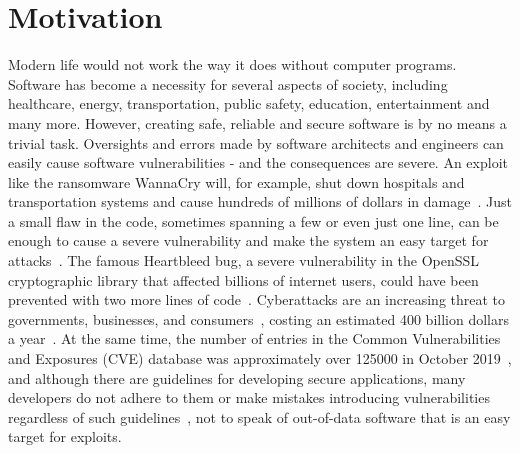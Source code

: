 \documentclass[
a4paper,
pagesize,
pdftex,
12pt,
twoside, %
BCOR=5mm, %
ngerman,
fleqn,
final,
]{scrartcl}
\begin{document}
	
	\setcounter{secnumdepth}{5} %
	
	\newpage
	\section{Motivation}\label{Motivation}
	Modern life would not work the way it does without computer programs. Software has become a necessity for several aspects of society, including healthcare, energy, transportation, public safety, education, entertainment and many more. However, creating safe, reliable and secure software is by no means a trivial task. Oversights and errors made by software architects and engineers can easily cause software vulnerabilities - and the consequences are severe. An exploit like the ransomware WannaCry will, for example, shut down hospitals and transportation systems and cause hundreds of millions of dollars in damage~\cite{DanGoodin.2017}. Just a small flaw in the code, sometimes spanning a few or even just one line, can be enough to cause a severe vulnerability and make the system an easy target for attacks~\cite{Yamaguchi.2012}. The famous Heartbleed bug, a severe vulnerability in the OpenSSL cryptographic library that affected billions of internet users, could have been prevented with two more lines of code~\cite{Durumeric.2014}. Cyberattacks are an increasing threat to governments, businesses, and consumers~\cite{Dam.2017}, costing an estimated 400 billion dollars a year~\cite{Losses.2014}. At the same time, the number of entries in the Common Vulnerabilities and Exposures (CVE) database was approximately over 125000 in October 2019~\cite{CVE}, and although there are guidelines for developing secure applications, many developers do not adhere to them or make mistakes introducing vulnerabilities regardless of such guidelines~\cite{Gupta.2014}, not to speak of out-of-data software that is an easy target for exploits.\\
	
\end{document}
